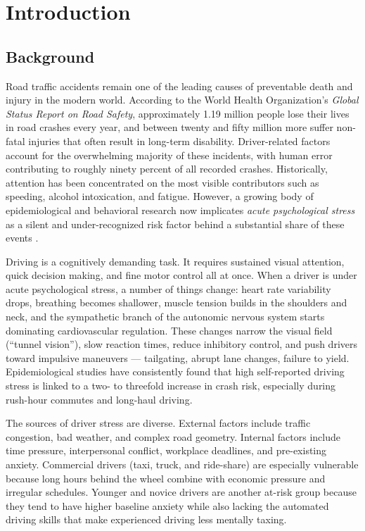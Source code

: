 \chapter{Introduction}
\label{ch:introduction}

\section{Background}
\label{sec:background}

Road traffic accidents remain one of the leading causes of preventable
death and injury in the modern world. According to the World Health
Organization's \emph{Global Status Report on Road Safety}, approximately
1.19 million people lose their lives in road crashes every year, and
between twenty and fifty million more suffer non-fatal injuries that
often result in long-term disability. Driver-related factors account
for the overwhelming majority of these incidents, with human error
contributing to roughly ninety percent of all recorded crashes.
Historically, attention has been concentrated on the most visible
contributors such as speeding, alcohol intoxication, and fatigue.
However, a growing body of epidemiological and behavioral research
now implicates \emph{acute psychological stress} as a silent and
under-recognized risk factor behind a substantial share of these
events \citep{sharma2012driver}.

Driving is a cognitively demanding task. It requires sustained visual
attention, quick decision making, and fine motor control all at once.
When a driver is under acute psychological stress, a number of things
change: heart rate variability drops, breathing becomes shallower,
muscle tension builds in the shoulders and neck, and the sympathetic
branch of the autonomic nervous system starts dominating cardiovascular
regulation. These changes narrow the visual field (``tunnel vision''),
slow reaction times, reduce inhibitory control, and push drivers toward
impulsive maneuvers --- tailgating, abrupt lane changes, failure to
yield. Epidemiological studies have consistently found that high
self-reported driving stress is linked to a two- to threefold increase
in crash risk, especially during rush-hour commutes and long-haul
driving.

The sources of driver stress are diverse. External factors include
traffic congestion, bad weather, and complex road geometry. Internal
factors include time pressure, interpersonal conflict, workplace
deadlines, and pre-existing anxiety. Commercial drivers (taxi,
truck, and ride-share) are especially vulnerable because long hours
behind the wheel combine with economic pressure and irregular
schedules. Younger and novice drivers are another at-risk group
because they tend to have higher baseline anxiety while also lacking
the automated driving skills that make experienced driving less
mentally taxing.

